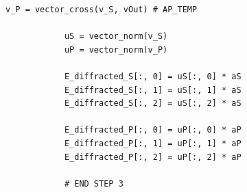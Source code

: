 \documentclass{iucr}
\newcommand{\todo}[1]{{\color{red}[TODO: "#1'']}}
\begin{document}
\begin{lstlisting}[caption={\todo{CORRECT!!} Code to guarantee that the local $\sigma$ and $\pi$ electric fields hold the orthogonality relationships.}, label={lst:finalorthogonality}, captionpos=b]
            v_P = vector_cross(v_S, vOut) # AP_TEMP

            uS = vector_norm(v_S)
            uP = vector_norm(v_P)

            E_diffracted_S[:, 0] = uS[:, 0] * aS
            E_diffracted_S[:, 1] = uS[:, 1] * aS
            E_diffracted_S[:, 2] = uS[:, 2] * aS

            E_diffracted_P[:, 0] = uP[:, 0] * aP
            E_diffracted_P[:, 1] = uP[:, 1] * aP
            E_diffracted_P[:, 2] = uP[:, 2] * aP

            # END STEP 3
\end{lstlisting}




\newpage
{}

\end{document}
